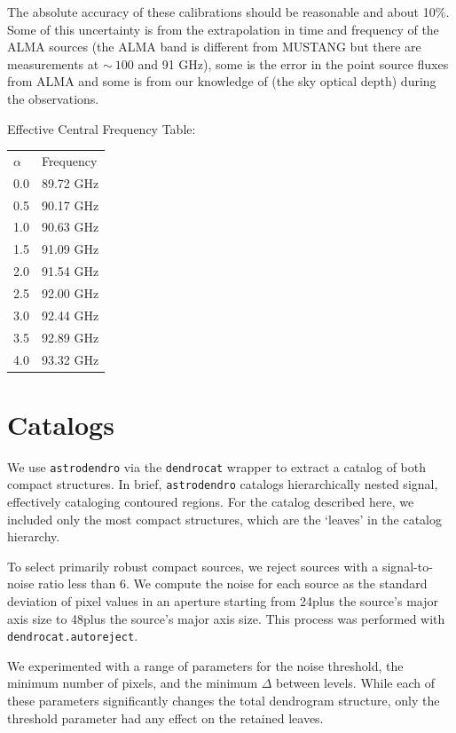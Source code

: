 \documentclass[twocolumn]{aastex62}
\begin{document}
The absolute accuracy of these calibrations should be reasonable and about 10\%.
Some of this uncertainty is from the extrapolation in time and frequency of the ALMA
sources (the ALMA band is different from MUSTANG but there are measurements at
$\sim~100$ and 91 GHz), some is the error in the point source fluxes from ALMA and
some is from our knowledge of \tau (the sky optical depth) during the observations.



Effective Central Frequency Table:

\begin{tabular}{ll}
$\alpha$ & Frequency \\
0.0 & 89.72 GHz \\
0.5 & 90.17 GHz \\
1.0 & 90.63 GHz \\
1.5 & 91.09 GHz \\
2.0 & 91.54 GHz \\
2.5 & 92.00 GHz \\
3.0 & 92.44 GHz \\
3.5 & 92.89 GHz \\
4.0 & 93.32 GHz 
\end{tabular}

\section{Catalogs}

We use \texttt{astrodendro} via the \texttt{dendrocat} wrapper to extract a
catalog of both compact structures.  In brief, \texttt{astrodendro} catalogs
hierarchically nested signal, effectively cataloging contoured regions.  For
the catalog described here, we included only the most compact structures, which
are the `leaves' in the catalog hierarchy.

To select primarily robust compact sources, we reject sources with a signal-to-noise
ratio less than 6.  We compute the noise for each source as the standard deviation
of pixel values in an aperture starting from 24\arcsec plus the source's major axis
size to 48\arcsec plus the source's major axis size.  This process was performed with
\texttt{dendrocat.autoreject}.

We experimented with a range of parameters for the noise threshold, the minimum
number of pixels, and the minimum $\Delta$ between levels.  While each of these
parameters significantly changes the total dendrogram structure, only the
threshold parameter had any effect on the retained leaves.
\end{document}
